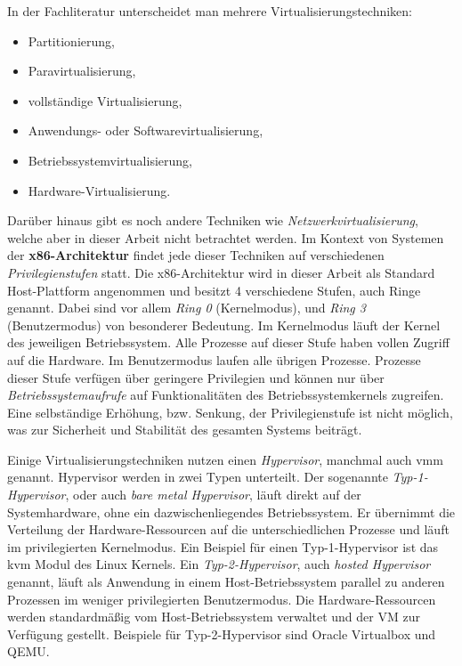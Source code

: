 In der Fachliteratur\cite{BSKompakt_Virt}\cite{BSGK_RBrause} unterscheidet man
mehrere Virtualisierungstechniken:
\begin{itemize}
    \item Partitionierung,
    \item Paravirtualisierung,
    \item vollständige Virtualisierung,
    \item Anwendungs- oder Softwarevirtualisierung,
    \item Betriebssystemvirtualisierung,
    \item Hardware-Virtualisierung.
\end{itemize}
Darüber hinaus gibt es noch andere Techniken wie
\textit{Netzwerkvirtualisierung}, welche aber in dieser Arbeit nicht betrachtet
werden.
Im Kontext von Systemen der \textbf{x86-Architektur} findet jede dieser
Techniken auf verschiedenen \textit{Privilegienstufen} statt.
Die x86-Architektur wird in dieser Arbeit als Standard Host-Plattform
angenommen und besitzt 4 verschiedene Stufen, auch Ringe
genannt\cite{BSKompakt_Syscall}.
\newline
Dabei sind vor allem \textit{Ring 0} (Kernelmodus), und \textit{Ring 3}
(Benutzermodus) von besonderer Bedeutung.
Im Kernelmodus läuft der Kernel des jeweiligen Betriebssystem. Alle Prozesse
auf dieser Stufe haben vollen Zugriff auf die Hardware\cite{BSKompakt_Syscall}.
\newline
Im Benutzermodus laufen alle übrigen Prozesse.
Prozesse dieser Stufe verfügen über geringere Privilegien und können nur über
\textit{Betriebssystemaufrufe} auf Funktionalitäten des Betriebssystemkernels
zugreifen\cite{BSKompakt_Syscall}.
Eine selbständige Erhöhung, bzw. Senkung, der Privilegienstufe ist nicht
möglich, was zur Sicherheit und Stabilität des gesamten Systems beiträgt.


Einige Virtualisierungstechniken nutzen einen \textit{Hypervisor}, manchmal
auch \ac{vmm} genannt.
Hypervisor werden in zwei Typen unterteilt.
\newline
Der sogenannte \textit{Typ-1-Hypervisor}, oder auch \textit{bare metal
Hypervisor}, läuft direkt auf der Systemhardware, ohne ein dazwischenliegendes
Betriebssystem.
Er übernimmt die Verteilung der Hardware-Ressourcen auf die unterschiedlichen
Prozesse und läuft im privilegierten Kernelmodus\cite{BSKompakt_Syscall}.
Ein Beispiel für einen Typ-1-Hypervisor ist das \ac{kvm} Modul des Linux
Kernels.
\newline
Ein \textit{Typ-2-Hypervisor}, auch \textit{hosted Hypervisor} genannt, läuft
als Anwendung in einem Host-Betriebssystem parallel zu anderen Prozessen im
weniger privilegierten Benutzermodus\cite{BSKompakt_Virt}.
Die Hardware-Ressourcen werden standardmäßig vom Host-Betriebssystem verwaltet
und der VM zur Verfügung gestellt.
Beispiele für Typ-2-Hypervisor sind Oracle Virtualbox und QEMU.

